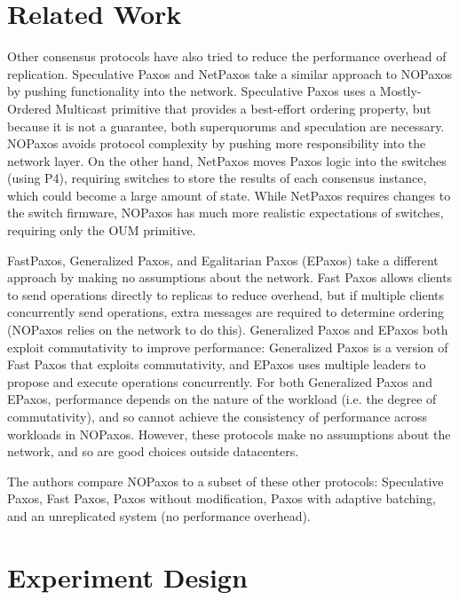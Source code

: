 \section{Related Work}

Other consensus protocols have also tried to reduce the performance overhead of replication. Speculative Paxos\cite{specpaxos} and NetPaxos\cite{netpaxos} take a similar approach to NOPaxos by pushing functionality into the network. Speculative Paxos uses a Mostly-Ordered Multicast primitive that provides a best-effort ordering property, but because it is not a guarantee, both superquorums and speculation are necessary. NOPaxos avoids protocol complexity by pushing more responsibility into the network layer. On the other hand, NetPaxos moves Paxos logic into the switches (using P4), requiring switches to store the results of each consensus instance, which could become a large amount of state. While NetPaxos requires changes to the switch firmware, NOPaxos has much more realistic expectations of switches, requiring only the OUM primitive. 

FastPaxos\cite{fastpaxos}, Generalized Paxos\cite{generalizedpaxos}, and Egalitarian Paxos\cite{epaxos} (EPaxos) take a different approach by making no assumptions about the network. Fast Paxos allows clients to send operations directly to replicas to reduce overhead, but if multiple clients concurrently send operations, extra messages are required to determine ordering (NOPaxos relies on the network to do this). Generalized Paxos and EPaxos both exploit commutativity to improve performance: Generalized Paxos is a version of Fast Paxos that exploits commutativity, and EPaxos uses multiple leaders to propose and execute operations concurrently. For both Generalized Paxos and EPaxos, performance depends on the nature of the workload (i.e. the degree of commutativity), and so cannot achieve the consistency of performance across workloads in NOPaxos. However, these protocols make no assumptions about the network, and so are good choices outside datacenters.

The authors compare NOPaxos to a subset of these other protocols: Speculative Paxos, Fast Paxos, Paxos without modification, Paxos with adaptive batching, and an unreplicated system (no performance overhead). 

\section{Experiment Design}

